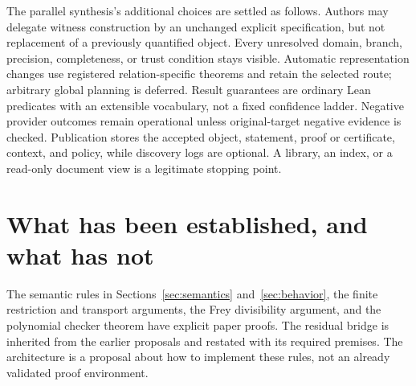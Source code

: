\documentclass[11pt,letterpaper]{article}
\theoremstyle{remark}
\begin{document}
The parallel synthesis's additional choices are settled as follows. Authors may
delegate witness construction by an unchanged explicit specification, but not
replacement of a previously quantified object. Every unresolved domain,
branch, precision, completeness, or trust condition stays visible. Automatic
representation changes use registered relation-specific theorems and retain the
selected route; arbitrary global planning is deferred. Result guarantees are
ordinary Lean predicates with an extensible vocabulary, not a fixed confidence
ladder. Negative provider outcomes remain operational unless original-target
negative evidence is checked. Publication stores the accepted object, statement,
proof or certificate, context, and policy, while discovery logs are optional.
A library, an index, or a read-only document view is a legitimate stopping
point.

\section{What has been established, and what has not}\label{sec:status}

The semantic rules in Sections~\ref{sec:semantics} and~\ref{sec:behavior}, the
finite restriction and transport arguments, the Frey divisibility argument,
and the polynomial checker theorem have explicit paper proofs. The residual
bridge is inherited from the earlier proposals and restated with its required
premises. The architecture is a proposal about how to implement these rules,
not an already validated proof environment.
\end{document}
